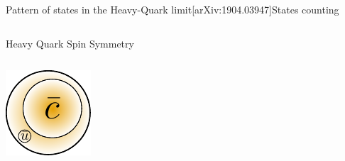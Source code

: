 \documentclass[aspectratio=169]{beamer}
\newcommand{\paper}[1]{{\scriptsize[#1]}}
\begin{document}
\begin{frame}{Pattern of states in the Heavy-Quark limit\hfill\paper{arXiv:1904.03947}}{States counting}
    \begin{columns}
        \begin{column}{0.5\textwidth}
            \begin{block}{Heavy Quark Spin Symmetry}
                \begin{columns}
                    \begin{column}{0.3\textwidth}
                        \includegraphics[width=\textwidth]{inline-figs/Meson_HQSS.pdf}

\end{column}
\end{columns}
\end{block}
\end{column}
\end{columns}
\end{frame}
\end{document}
